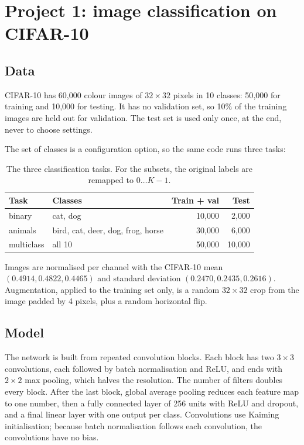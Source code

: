 \documentclass[11pt,a4paper]{article}
\begin{document}
\section{Project 1: image classification on CIFAR-10}\label{sec:cls}

\subsection{Data}

CIFAR-10 has 60{,}000 colour images of $32\times32$ pixels in 10 classes: 50{,}000
for training and 10{,}000 for testing. It has no validation set, so 10\% of the
training images are held out for validation. The test set is used only once, at
the end, never to choose settings.

The set of classes is a configuration option, so the same code runs three tasks:

\begin{table}[H]
\centering\small
\begin{tabular}{llrr}
\toprule
\textbf{Task} & \textbf{Classes} & \textbf{Train + val} & \textbf{Test} \\
\midrule
binary & cat, dog & 10{,}000 & 2{,}000 \\
animals & bird, cat, deer, dog, frog, horse & 30{,}000 & 6{,}000 \\
multiclass & all 10 & 50{,}000 & 10{,}000 \\
\bottomrule
\end{tabular}
\caption{The three classification tasks. For the subsets, the original labels are
remapped to $0 \dots K-1$.}
\end{table}

Images are normalised per channel with the CIFAR-10 mean
$(0.4914, 0.4822, 0.4465)$ and standard deviation $(0.2470, 0.2435, 0.2616)$.
Augmentation, applied to the training set only, is a random $32\times32$ crop
from the image padded by 4 pixels, plus a random horizontal flip.

\subsection{Model}

The network is built from repeated convolution blocks. Each block has two
$3\times3$ convolutions, each followed by batch normalisation and ReLU, and ends
with $2\times2$ max pooling, which halves the resolution. The number of filters
doubles every block. After the last block, global average pooling reduces each
feature map to one number, then a fully connected layer of 256 units with ReLU
and dropout, and a final linear layer with one output per class. Convolutions use
Kaiming initialisation; because batch normalisation follows each convolution,
the convolutions have no bias.
\end{document}

